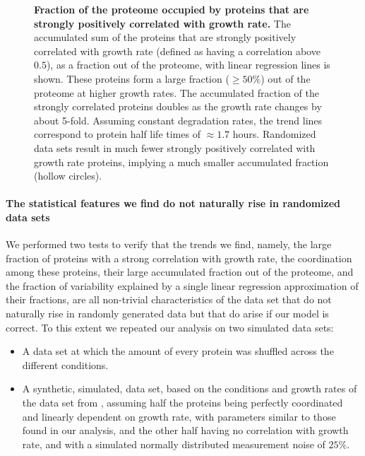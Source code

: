 \documentclass[10pt,letterpaper]{article}
\begin{document}
\begin{figure}[h]
\begin{center}
\caption{\label{fig:globalgrcorr}
{\bf Fraction of the proteome occupied by proteins that are strongly positively correlated with growth rate.}
The accumulated sum of the proteins that are strongly positively correlated with growth rate (defined as having a correlation above $0.5$), as a fraction out of the proteome, with linear regression lines is shown.
These proteins form a large fraction ($\ge 50\%$) out of the proteome at higher growth rates.
The accumulated fraction of the strongly correlated proteins doubles as the growth rate changes by about 5-fold.
Assuming constant degradation rates, the trend lines correspond to protein half life times of $\approx 1.7$ hours.
Randomized data sets result in much fewer strongly positively correlated with growth rate proteins, implying a much smaller accumulated fraction (hollow circles).
%
}
\end{center}
\end{figure}

\paragraph{The statistical features we find do not naturally rise in randomized data sets}

We performed two tests to verify that the trends we find, namely, the large fraction of proteins with a strong correlation with growth rate, the coordination among these proteins, their large accumulated fraction out of the proteome, and the fraction of variability explained by a single linear regression approximation of their fractions, are all non-trivial characteristics of the data set that do not naturally rise in randomly generated data but that do arise if our model is correct.
To this extent we repeated our analysis on two simulated data sets:
\begin{itemize}
\item A data set at which the amount of every protein was shuffled across the different conditions.
\item A synthetic, simulated, data set, based on the conditions and growth rates of the data set from \cite{Schmidt2015}, assuming half the proteins being perfectly coordinated and linearly dependent on growth rate, with parameters similar to those found in our analysis, and the other half having no correlation with growth rate, and with a simulated normally distributed measurement noise of $25\%$.
\end{itemize}
\end{document}
